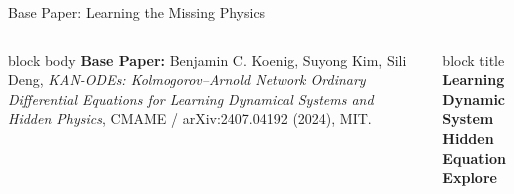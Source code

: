 \documentclass[aspectratio=169,10pt]{beamer}
\begin{document}
\begin{frame}{Base Paper: Learning the Missing Physics}
  \vspace{0.8em}
  \begin{columns}[T,onlytextwidth]
      \begin{beamercolorbox}[rounded=true,sep=0.55em]{block body}
        \scriptsize
        \textbf{Base Paper:} Benjamin C. Koenig, Suyong Kim, Sili Deng, \emph{KAN-ODEs: Kolmogorov--Arnold Network Ordinary Differential Equations for Learning Dynamical Systems and Hidden Physics}, CMAME / arXiv:2407.04192 (2024), MIT.
      \end{beamercolorbox}
      \begin{beamercolorbox}[rounded=true,center,sep=0.6em]{block title}
        \alert{\textbf{\small Learning Dynamic System}}\\[0.15em]
        \textbf{\small Hidden Equation Explore }
      \end{beamercolorbox}
  \end{columns}
\end{frame}
\end{document}
